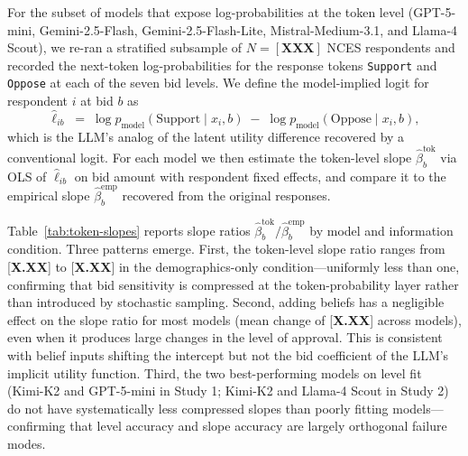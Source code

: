 \documentclass[12pt]{article}
\begin{document}
For the subset of models that expose log-probabilities at the token level (GPT-5-mini, Gemini-2.5-Flash, Gemini-2.5-Flash-Lite, Mistral-Medium-3.1, and Llama-4 Scout), we re-ran a stratified subsample of $N = [\textbf{XXX}]$ NCES respondents and recorded the next-token log-probabilities for the response tokens \texttt{Support} and \texttt{Oppose} at each of the seven bid levels. We define the model-implied logit for respondent $i$ at bid $b$ as
\begin{equation}
    \hat{\ell}_{ib} \;=\; \log p_{\text{model}}(\text{Support} \mid x_i, b) \;-\; \log p_{\text{model}}(\text{Oppose} \mid x_i, b),
    \label{eq:token-logit}
\end{equation}
which is the LLM's analog of the latent utility difference recovered by a conventional logit. For each model we then estimate the token-level slope $\hat{\beta}_b^{\text{tok}}$ via OLS of $\hat{\ell}_{ib}$ on bid amount with respondent fixed effects, and compare it to the empirical slope $\hat{\beta}_b^{\text{emp}}$ recovered from the original \textcite{Aldy2012} responses.

Table~\ref{tab:token-slopes} reports slope ratios $\hat{\beta}_b^{\text{tok}} / \hat{\beta}_b^{\text{emp}}$ by model and information condition. Three patterns emerge. First, the token-level slope ratio ranges from [\textbf{X.XX}] to [\textbf{X.XX}] in the demographics-only condition---uniformly less than one, confirming that bid sensitivity is compressed at the token-probability layer rather than introduced by stochastic sampling. Second, adding beliefs has a negligible effect on the slope ratio for most models (mean change of [\textbf{X.XX}] across models), even when it produces large changes in the level of approval. This is consistent with belief inputs shifting the intercept but not the bid coefficient of the LLM's implicit utility function. Third, the two best-performing models on level fit (Kimi-K2 and GPT-5-mini in Study 1; Kimi-K2 and Llama-4 Scout in Study 2) do not have systematically less compressed slopes than poorly fitting models---confirming that level accuracy and slope accuracy are largely orthogonal failure modes.
\end{document}
